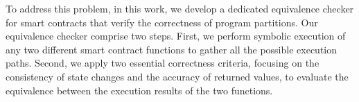 To address this problem, in this work, we develop a dedicated equivalence checker for smart contracts that verify the correctness of program partitions.
Our equivalence checker comprise two steps. 
First, we perform symbolic execution of any two different smart contract functions to gather all the possible execution paths.
{Second, we apply two essential correctness criteria, focusing on the consistency of state changes and the accuracy of returned values, to evaluate the equivalence between the execution results of the two functions.}

